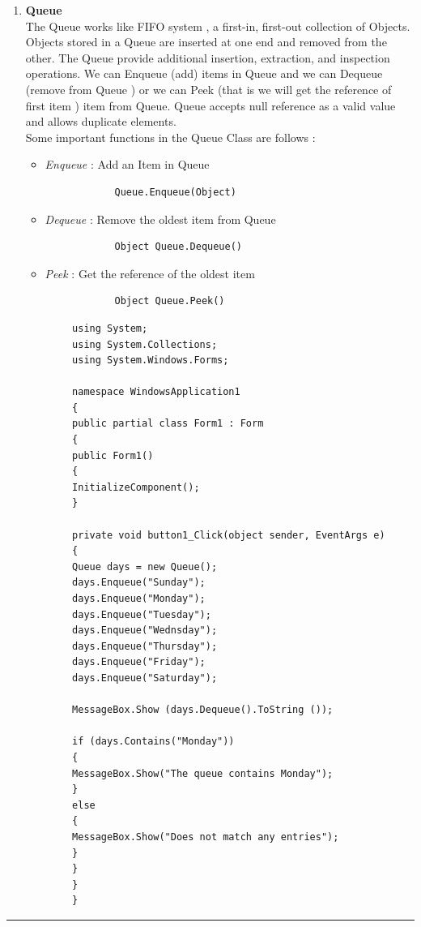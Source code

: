 \documentclass[11pt,dvipsnames,cmyk]{article}
\begin{document}
\begin{enumerate}
\begin{verbatim}
		private void button1_Click(object sender, EventArgs e)
		{
		Stack days = new Stack();
		days.Push("SunDay");
		days.Push("MonDay");
		days.Push("TueDay");
		days.Push("WedDay");
		days.Push("ThuDay");
		days.Push("FriDay");
		days.Push("SaturDay");
		if (days.Count ==7)
		{
		MessageBox.Show(days.Pop().ToString ());
		}
		else
		{
		MessageBox.Show("SaturDay does not exist");
		}
		}
		}
		}
		\end{verbatim}
 		
 		\item \textbf{Queue}
 		\\The Queue works like FIFO system , a first-in, first-out collection of Objects. Objects stored in a Queue are inserted at one end and removed from the other. The Queue provide additional insertion, extraction, and inspection operations. We can Enqueue (add) items in Queue and we can Dequeue (remove from Queue ) or we can Peek (that is we will get the reference of first item ) item from Queue. Queue accepts null reference as a valid value and allows duplicate elements.
 		\\Some important functions in the Queue Class are follows :
 		\begin{itemize}
 			\item \emph{Enqueue} : Add an Item in Queue
 			\begin{verbatim}
 			Queue.Enqueue(Object)
 			\end{verbatim}
 			\item \emph{Dequeue} : Remove the oldest item from Queue
 			\begin{verbatim}
 			Object Queue.Dequeue()
 			\end{verbatim}
 			\item \emph{Peek} : Get the reference of the oldest item
 			\begin{verbatim}
 			Object Queue.Peek()
 			\end{verbatim}
 		\end{itemize}
 		\begin{verbatim}
 		using System;
 		using System.Collections;
 		using System.Windows.Forms;
 		
 		namespace WindowsApplication1
 		{
 		public partial class Form1 : Form
 		{
 		public Form1()
 		{
 		InitializeComponent();
 		}
 		
 		private void button1_Click(object sender, EventArgs e)
 		{
 		Queue days = new Queue();
 		days.Enqueue("Sunday");
 		days.Enqueue("Monday");
 		days.Enqueue("Tuesday");
 		days.Enqueue("Wednsday");
 		days.Enqueue("Thursday");
 		days.Enqueue("Friday");
 		days.Enqueue("Saturday");
 		
 		MessageBox.Show (days.Dequeue().ToString ());
 		
 		if (days.Contains("Monday"))
 		{
 		MessageBox.Show("The queue contains Monday");
 		}
 		else
 		{
 		MessageBox.Show("Does not match any entries");
 		}
 		}
 		}
 		}
 		\end{verbatim}
	 \end{enumerate}
 	 \rule{6.27in}{1.2pt}
 	 
\end{document}
